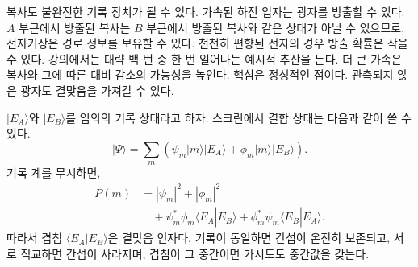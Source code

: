 \begin{classroomqa}
\end{classroomqa}

복사도 불완전한 기록 장치가 될 수 있다. 가속된 하전 입자는 광자를 방출할 수 있다. \(A\) 부근에서 방출된 복사는 \(B\) 부근에서 방출된 복사와 같은 상태가 아닐 수 있으므로, 전자기장은 경로 정보를 보유할 수 있다. 천천히 편향된 전자의 경우 방출 확률은 작을 수 있다. 강의에서는 대략 백 번 중 한 번 일어나는 예시적 추산을 든다. 더 큰 가속은 복사와 그에 따른 대비 감소의 가능성을 높인다. 핵심은 정성적인 점이다. 관측되지 않은 광자도 결맞음을 가져갈 수 있다.

\begin{classroomqa}
\end{classroomqa}

\begin{classroomqa}
\end{classroomqa}

\(|E_A\rangle\)와 \(|E_B\rangle\)를 임의의 기록 상태라고 하자. 스크린에서 결합 상태는 다음과 같이 쓸 수 있다.
\begin{equation}
|\Psi\rangle
=\sum_m\left(
\psi_m|m\rangle|E_A\rangle
+\phi_m|m\rangle|E_B\rangle
\right).
\end{equation}
기록 계를 무시하면,
\begin{align}
P(m)
&=|\psi_m|^2+|\phi_m|^2 \\
&\quad
+\psi_m^*\phi_m\langle E_A|E_B\rangle
+\phi_m^*\psi_m\langle E_B|E_A\rangle.
\end{align}
따라서 겹침 \(\langle E_A|E_B\rangle\)은 결맞음 인자다. 기록이 동일하면 간섭이 온전히 보존되고, 서로 직교하면 간섭이 사라지며, 겹침이 그 중간이면 가시도도 중간값을 갖는다.

